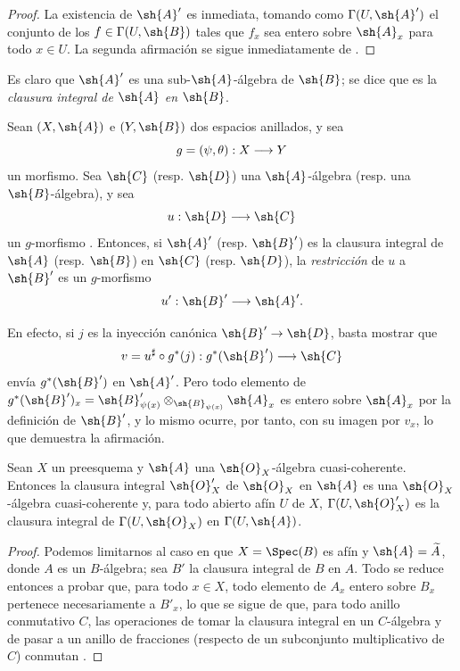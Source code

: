 \documentclass[oneside,10pt]{amsart}
\makeatletter
\newcommand{\ega@arrow}[2]{\mathchoice{#1}{#2}{#2}{#2}}
\renewcommand{\to}{\ega@arrow{\longrightarrow}{\rightarrow}}
\newcommand{\oldpage}[2][]{\marginnote{\normalfont\footnotesize\textbf{#1}~|~#2}\ignorespaces}
\let\EGAOriginalLabel\label
\renewcommand{\label}[1]{\phantomsection\EGAOriginalLabel{#1}}
\makeatother
\begin{document}
\begin{proof}
La existencia de $\sh{A}'$ es inmediata, tomando como $\Gamma(U,\sh{A}')$ el conjunto de los $f\in\Gamma(U,\sh{B})$ tales que $f_x$ sea entero sobre $\sh{A}_x$ para todo $x\in U$.
La segunda afirmación se sigue inmediatamente de .
\end{proof}

Es claro que $\sh{A}'$ es una sub-$\sh{A}$-álgebra de $\sh{B}$;
se dice que es la \emph{clausura integral de $\sh{A}$ en $\sh{B}$}.

\begin{env}[6.3.3]
\label{II.6.3.3}
Sean $(X,\sh{A})$ e $(Y,\sh{B})$ dos espacios anillados, y sea
\[
  g = (\psi,\theta):X\to Y
\]
un morfismo.
Sea $\sh{C}$ (resp. $\sh{D}$) una $\sh{A}$-álgebra (resp. una $\sh{B}$-álgebra), y sea
\[
  u:\sh{D}\to\sh{C}
\]
un $g$-morfismo .
Entonces, si $\sh{A}'$ (resp. $\sh{B}'$) es la clausura integral de $\sh{A}$ (resp. $\sh{B}$) en $\sh{C}$ (resp. $\sh{D}$), la \emph{restricción} de $u$ a $\sh{B}'$ es un $g$-morfismo
\[
  u':\sh{B}'\to\sh{A}'.
\]

En efecto, si $j$ es la inyección canónica $\sh{B}'\to\sh{D}$, basta mostrar que
\[
  v = u^\sharp\circ g^*(j) : g^*(\sh{B}')\to\sh{C}
\]
envía $g^*(\sh{B}')$ en $\sh{A}'$.
Pero todo elemento de $g^*(\sh{B}')_x=\sh{B}'_{\psi(x)}\otimes_{\sh{B}_{\psi(x)}}\sh{A}_x$ es entero sobre $\sh{A}_x$ por la definición de $\sh{B}'$, y lo mismo ocurre, por tanto, con su imagen por $v_x$, lo que demuestra la afirmación.
\end{env}

\begin{proposition}[6.3.4]
\label{II.6.3.4}
Sean $X$ un preesquema y $\sh{A}$ una $\sh{O}_X$-álgebra cuasi-coherente.
Entonces la clausura integral $\sh{O}'_X$ de $\sh{O}_X$ en $\sh{A}$ es una $\sh{O}_X$-álgebra cuasi-coherente y, para todo abierto afín $U$ de $X$, $\Gamma(U,\sh{O}'_X)$ es la clausura integral de $\Gamma(U,\sh{O}_X)$ en $\Gamma(U,\sh{A})$.
\end{proposition}

\begin{proof}
Podemos limitarnos al caso en que $X=\Spec(B)$ es afín y $\sh{A}=\widetilde{A}$, donde $A$ es un $B$-álgebra;
\oldpage[II]{118}
sea $B'$ la clausura integral de $B$ en $A$.
Todo se reduce entonces a probar que, para todo $x\in X$, todo elemento de $A_x$ entero sobre $B_x$ pertenece necesariamente a $B'_x$, lo que se sigue de que, para todo anillo conmutativo $C$, las operaciones de tomar la clausura integral en un $C$-álgebra y de pasar a un anillo de fracciones (respecto de un subconjunto multiplicativo de $C$) conmutan \cite[t.~I, pp.~261 y 257]{I-13}.
\end{proof}
\end{document}
